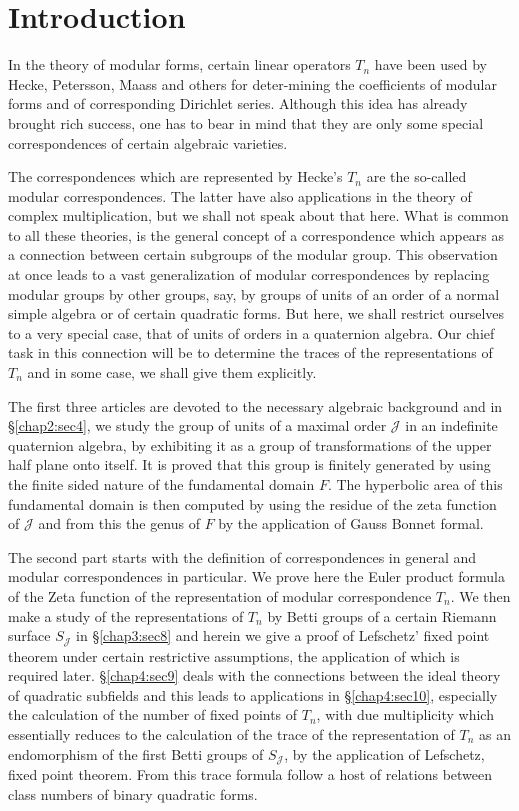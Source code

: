\chapter*{Introduction}


In the theory of modular forms, certain linear operators $T_n$ have
been used by Hecke, Petersson, Maass and others for deter-mining the
coefficients of modular forms and of corresponding Dirichlet
series. Although this idea has already brought rich success, one has
to bear in mind that they are only some special correspondences of
certain algebraic varieties. 

The correspondences which are represented by Hecke's $T_n$ are the
so-called modular correspondences. The latter have also applications
in the theory of complex multiplication, but we shall not speak about
that here. What is common to all these theories, is the general concept
of a correspondence which appears as a connection between certain
subgroups of the modular group. This observation at once leads to a
vast generalization of modular correspondences by replacing modular
groups by other groups, say, by groups of units of an order of a
normal simple algebra or of certain quadratic forms. But here, we
shall restrict ourselves to a very special case, that of units of
orders in a quaternion algebra. Our chief task in this connection will
be to determine the traces of the representations of $T_n$ and in some
case, we shall give them explicitly. 

The first three articles are devoted to the necessary algebraic
background and in \S \ref{chap2:sec4}, we study the group of units of a maximal
order $\mathcal{J}$ in an indefinite quaternion algebra, by exhibiting
it as a group of transformations of the upper half plane onto
itself. It is proved that this group is finitely generated by using
the finite sided nature of the fundamental domain $F$. The hyperbolic
area of this fundamental domain is then computed by using the residue
of the zeta function of $\mathcal{J}$ and from this the genus of $F$
by the application of Gauss Bonnet formal. 

The second part starts with the definition of correspondences in
general and modular correspondences in particular. We prove here the
Euler product formula of the Zeta function of the representation of
modular correspondence $T_n$. We then make a study of the
representations of $T_n$ by Betti groups of a certain Riemann surface
$S_\mathcal{J}$ in \S \ref{chap3:sec8} and herein we give a proof of Lefschetz'
fixed point theorem under certain restrictive assumptions, the
application of which is required later. \S \ref{chap4:sec9} deals with the
connections between the ideal theory of quadratic subfields and this
leads to applications in \S \ref{chap4:sec10}, especially the calculation of the
number of fixed points of $T_n$, with due multiplicity which
essentially reduces to the calculation of the trace of the
representation of $T_n$ as an endomorphism of the first Betti groups
of $S_{\mathcal{J}}$, by the application of Lefschetz, fixed 
point theorem. From this trace formula follow a host of relations
between class numbers of binary quadratic forms. 

